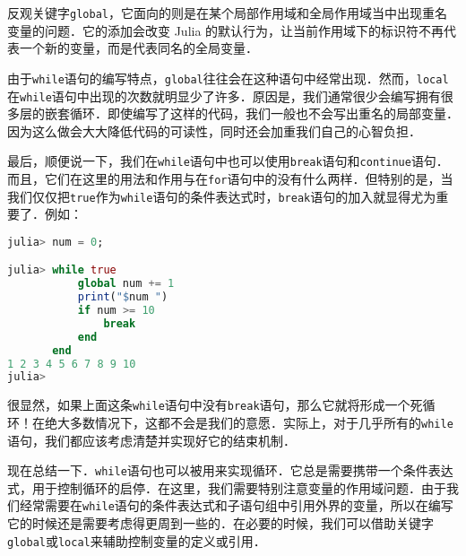 反观关键字\verb|global|，它面向的则是在某个局部作用域和全局作用域当中出现重名变量的问题．它的添加会改变 Julia 的默认行为，让当前作用域下的标识符不再代表一个新的变量，而是代表同名的全局变量．

由于\verb|while|语句的编写特点，\verb|global|往往会在这种语句中经常出现．然而，\verb|local|在\verb|while|语句中出现的次数就明显少了许多．原因是，我们通常很少会编写拥有很多层的嵌套循环．即使编写了这样的代码，我们一般也不会写出重名的局部变量．因为这么做会大大降低代码的可读性，同时还会加重我们自己的心智负担．

最后，顺便说一下，我们在\verb|while|语句中也可以使用\verb|break|语句和\verb|continue|语句．而且，它们在这里的用法和作用与在\verb|for|语句中的没有什么两样．但特别的是，当我们仅仅把\verb|true|作为\verb|while|语句的条件表达式时，\verb|break|语句的加入就显得尤为重要了．例如：

\begin{lstlisting}[language=julia]
julia> num = 0;

julia> while true
           global num += 1
           print("$num ")
           if num >= 10
               break
           end
       end
1 2 3 4 5 6 7 8 9 10 
julia> 
\end{lstlisting}

很显然，如果上面这条\verb|while|语句中没有\verb|break|语句，那么它就将形成一个死循环！在绝大多数情况下，这都不会是我们的意愿．实际上，对于几乎所有的\verb|while|语句，我们都应该考虑清楚并实现好它的结束机制．

现在总结一下．\verb|while|语句也可以被用来实现循环．它总是需要携带一个条件表达式，用于控制循环的启停．在这里，我们需要特别注意变量的作用域问题．由于我们经常需要在\verb|while|语句的条件表达式和子语句组中引用外界的变量，所以在编写它的时候还是需要考虑得更周到一些的．在必要的时候，我们可以借助关键字\verb|global|或\verb|local|来辅助控制变量的定义或引用．
